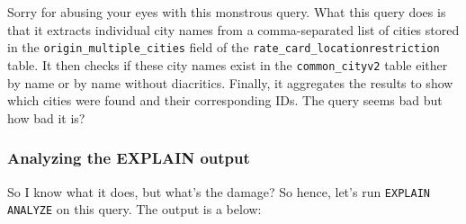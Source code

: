 \documentclass[11pt]{article}
\begin{document}
Sorry for abusing your eyes with this monstrous query. What this query does is that it extracts individual city names from a comma-separated list of cities stored in the \verb|origin_multiple_cities| field of the \verb|rate_card_locationrestriction| table. It then checks if these city names exist in the \verb|common_cityv2| table either by name or by name without diacritics. Finally, it aggregates the results to show which cities were found and their corresponding IDs. The query seems bad but how bad it is?

\subsubsection{Analyzing the EXPLAIN output}

So I know what it does, but what's the damage? So hence, let's run \texttt{EXPLAIN ANALYZE} on this query. The output is a below:
\end{document}
